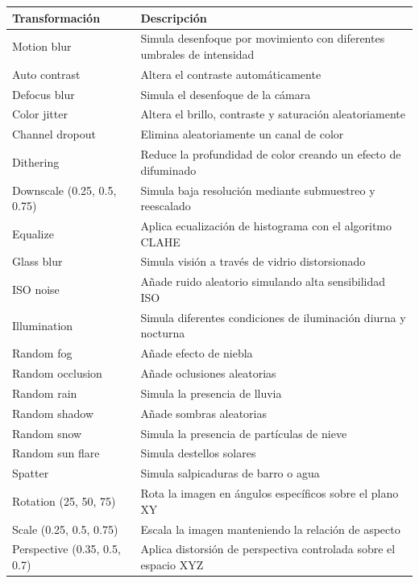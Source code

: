 \sffamily
\footnotesize
{}
\begin{tcolorbox}[
  colback=white,
  colframe=MASA-Blue,
  title={Tabla~\thetable~Transformaciones implementadas en el módulo MLP-Augmentator},
  boxrule=0.5mm,
  arc=2mm,
  width=\textwidth,
  enhanced,
  fonttitle=\bfseries,
  before upper=\vspace{2mm},
  after upper=\vspace{2mm}
]
\label{tab_transforms}
\renewcommand{\arraystretch}{1.5}
\begin{tabularx}{\textwidth}{@{}l X@{}}
\textbf{Transformación} & \textbf{Descripción} \\
\midrule
Motion blur & Simula desenfoque por movimiento con diferentes umbrales de intensidad \\
Auto contrast & Altera el contraste automáticamente \\
Defocus blur & Simula el desenfoque de la cámara \\
Color jitter & Altera el brillo, contraste y saturación aleatoriamente \\
Channel dropout & Elimina aleatoriamente un canal de color \\
Dithering & Reduce la profundidad de color creando un efecto de difuminado \\
Downscale (0.25, 0.5, 0.75) & Simula baja resolución mediante submuestreo y reescalado \\
Equalize & Aplica ecualización de histograma con el algoritmo CLAHE \\
Glass blur & Simula visión a través de vidrio distorsionado \\
ISO noise & Añade ruido aleatorio simulando alta sensibilidad ISO \\
Illumination & Simula diferentes condiciones de iluminación diurna y nocturna \\
Random fog & Añade efecto de niebla \\
Random occlusion & Añade oclusiones aleatorias \\
Random rain & Simula la presencia de lluvia \\
Random shadow & Añade sombras aleatorias \\
Random snow & Simula la presencia de partículas de nieve \\
Random sun flare & Simula destellos solares \\
Spatter & Simula salpicaduras de barro o agua \\
Rotation (25, 50, 75) & Rota la imagen en ángulos específicos sobre el plano XY \\
Scale (0.25, 0.5, 0.75) & Escala la imagen manteniendo la relación de aspecto \\
Perspective (0.35, 0.5, 0.7) & Aplica distorsión de perspectiva controlada sobre el espacio XYZ \\
\end{tabularx}
\end{tcolorbox}
\normalsize
\normalfont



